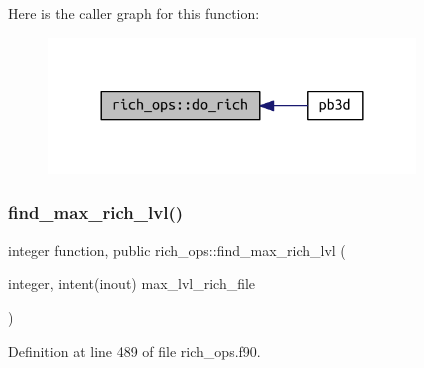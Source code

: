 Here is the caller graph for this function\+:
\nopagebreak
\begin{figure}[H]
\begin{center}
\leavevmode
\includegraphics[width=276pt]{namespacerich__ops_a50f4088b9ddd59597987fb4112f2a73e_icgraph}
\end{center}
\end{figure}
\mbox{\label{namespacerich__ops_acadb2170408937a71a230e655bd15675}} 
\subsubsection{\texorpdfstring{find\+\_\+max\+\_\+rich\+\_\+lvl()}{find\_max\_rich\_lvl()}}
{\footnotesize\ttfamily integer function, public rich\+\_\+ops\+::find\+\_\+max\+\_\+rich\+\_\+lvl (\begin{DoxyParamCaption}\item[{integer, intent(inout)}]{max\+\_\+lvl\+\_\+rich\+\_\+file }\end{DoxyParamCaption})}



Definition at line 489 of file rich\+\_\+ops.\+f90.

